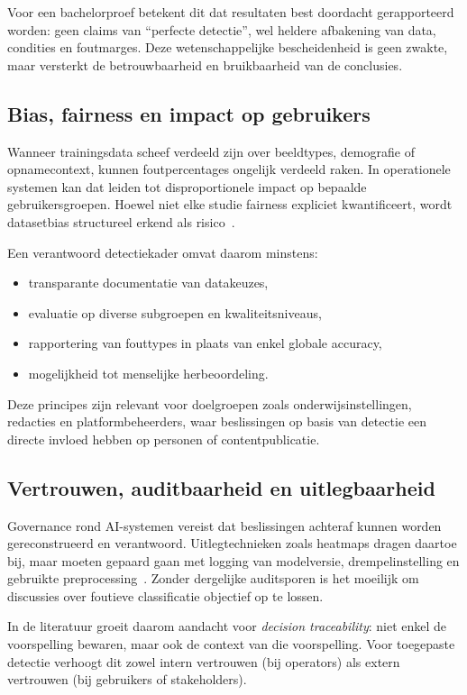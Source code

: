 Voor een bachelorproef betekent dit dat resultaten best doordacht gerapporteerd worden: geen claims van ``perfecte detectie'', wel heldere afbakening van data, condities en foutmarges. Deze wetenschappelijke bescheidenheid is geen zwakte, maar versterkt de betrouwbaarheid en bruikbaarheid van de conclusies.

\subsection{Bias, fairness en impact op gebruikers}
Wanneer trainingsdata scheef verdeeld zijn over beeldtypes, demografie of opnamecontext, kunnen foutpercentages ongelijk verdeeld raken. In operationele systemen kan dat leiden tot disproportionele impact op bepaalde gebruikersgroepen. Hoewel niet elke studie fairness expliciet kwantificeert, wordt datasetbias structureel erkend als risico~\autocite{Pei2024,EvaluationModels2025}. 

Een verantwoord detectiekader omvat daarom minstens:
\begin{itemize}
  \item transparante documentatie van datakeuzes,
  \item evaluatie op diverse subgroepen en kwaliteitsniveaus,
  \item rapportering van fouttypes in plaats van enkel globale accuracy,
  \item mogelijkheid tot menselijke herbeoordeling.
\end{itemize}

Deze principes zijn relevant voor doelgroepen zoals onderwijsinstellingen, redacties en platformbeheerders, waar beslissingen op basis van detectie een directe invloed hebben op personen of contentpublicatie.

\subsection{Vertrouwen, auditbaarheid en uitlegbaarheid}
Governance rond AI-systemen vereist dat beslissingen achteraf kunnen worden gereconstrueerd en verantwoord. Uitlegtechnieken zoals heatmaps dragen daartoe bij, maar moeten gepaard gaan met logging van modelversie, drempelinstelling en gebruikte preprocessing~\autocite{SIDA2025}. Zonder dergelijke auditsporen is het moeilijk om discussies over foutieve classificatie objectief op te lossen.

In de literatuur groeit daarom aandacht voor \emph{decision traceability}: niet enkel de voorspelling bewaren, maar ook de context van die voorspelling. Voor toegepaste detectie verhoogt dit zowel intern vertrouwen (bij operators) als extern vertrouwen (bij gebruikers of stakeholders).

